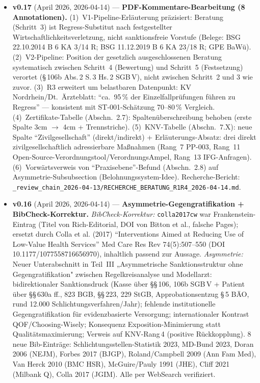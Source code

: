 \documentclass{umbruch-position}
\begin{document}
{\begin{itemize}[leftmargin=3em, itemsep=0.5em]
  \item \textbf{v0.17} (April 2026, 2026-04-14) --- \textbf{PDF-Kommentare-Bearbeitung (8 Annotationen).} (1)~V1-Pipeline-Erläuterung präzisiert: Beratung (Schritt~3) ist Regress-Substitut nach festgestellter Wirtschaftlichkeitsverletzung, nicht sanktionsfreie Vorstufe (Belege: BSG 22.10.2014 B 6 KA 3/14 R; BSG 11.12.2019 B 6 KA 23/18 R; GPE BaWü). (2)~V2-Pipeline: Position der gesetzlich ausgeschlossenen Beratung systematisch zwischen Schritt~4 (Bewertung) und Schritt~5 (Festsetzung) verortet (\S\,106b Abs.\,2 S.\,3 Hs.\,2 SGB\,V), nicht zwischen Schritt~2 und 3 wie zuvor. (3)~R3 erweitert um belastbaren Datenpunkt: KV Nordrhein/Dt.~Ärzteblatt: ``ca.~95\,\% der Einzelfallprüfungen führen zu Regress'' --- konsistent mit ST-001-Schätzung 70--80\,\% Vergleich. (4)~Zertifikate-Tabelle (Abschn.~2.7): Spaltenüberschreibung behoben (erste Spalte 3cm $\to$ 4cm + Trennstriche). (5)~KNV-Tabelle (Abschn.~7.X): neue Spalte ``Zivilgesellschaft'' (direkt/indirekt) + Erläuterungs-Absatz: drei direkt zivilgesellschaftlich adressierbare Maßnahmen (Rang~7 PP-003, Rang~11 Open-Source-Verordnungstool/VerordnungsAmpel, Rang~13 IFG-Anfragen). (6)~Vorwärtsverweis von ``Praxisebene''-Befund (Abschn.~2.8) auf Asymmetrie-Subsubsection (Belohnungssystem-Idee). Recherche-Bericht: \texttt{\_review\_chain\_2026-04-13/RECHERCHE\_BERATUNG\_R1R4\_2026-04-14.md}.

  \item \textbf{v0.16} (April 2026, 2026-04-14) --- \textbf{Asymmetrie-Gegengratifikation + BibCheck-Korrektur.} \emph{BibCheck-Korrektur:} \texttt{colla2017cw} war Frankenstein-Eintrag (Titel von Rich-Editorial, DOI von Bitton et al., falsche Pages); ersetzt durch Colla et al. (2017) ``Interventions Aimed at Reducing Use of Low-Value Health Services'' Med Care Res Rev 74(5):507--550 (DOI 10.1177/1077558716656970), inhaltlich passend zur Aussage. \emph{Asymmetrie:} Neuer Unterabschnitt in Teil~III „Asymmetrische Sanktionsstruktur ohne Gegengratifikation" zwischen Regelkreisanalyse und Modellarzt: bidirektionaler Sanktionsdruck (Kasse über \S\S\,106, 106b SGB\,V + Patient über \S\S\,630a ff., 823 BGB, \S\S\,223, 229 StGB, Approbationsentzug \S\,5 B\"AO, rund 12.000 Schlichtungsverfahren/Jahr); fehlende institutionelle Gegengratifikation für evidenzbasierte Versorgung; internationaler Kontrast QOF/Choosing-Wisely; Konsequenz Exposition-Minimierung statt Qualitätsmaximierung; Verweis auf KNV-Rang\,4 (positive Rückkopplung). 8 neue Bib-Einträge: Schlichtungsstellen-Statistik 2023, MD-Bund 2023, Doran 2006 (NEJM), Forbes 2017 (BJGP), Roland/Campbell 2009 (Ann Fam Med), Van Herck 2010 (BMC HSR), McGuire/Pauly 1991 (JHE), Cliff 2021 (Milbank Q), Colla 2017 (JGIM). Alle per WebSearch verifiziert.


\end{itemize}}
\end{document}
